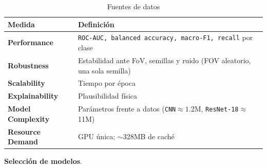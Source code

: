 \documentclass[12pt]{article}
\begin{document}
\begin{table}[H]
    \centering
    \scriptsize
    \begin{tabular}{|p{}|p{}|}
    \hline
    \textbf{Medida} & \textbf{Definición} \\
    \hline

    \textbf{Performance} &
    \texttt{ROC-AUC, balanced accuracy, macro-F1, recall} por clase \\ \hline

    \textbf{Robustness} &
    Estabilidad ante FoV, semillas y ruido (FOV aleatorio, una sola semilla) \\ \hline

    \textbf{Scalability} &
    Tiempo por época \\ \hline

    \textbf{Explainability} &
    Plausibilidad física \\ \hline

    \textbf{Model Complexity} &
    Parámetros frente a datos (\texttt{CNN}$\approx1$.2M, \texttt{ResNet-18}$\approx$11M)\\ \hline

    \textbf{Resource Demand} &
    GPU única; $\sim$328MB de caché \\ \hline

    \end{tabular}
    \caption{Fuentes de datos}
    \label{aplicacion}
\end{table}

\textbf{Selección de modelos}.
\end{document}
